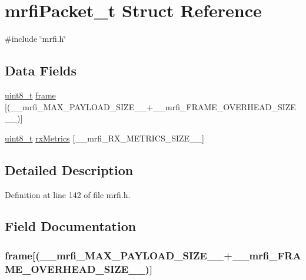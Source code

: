 \hypertarget{structmrfiPacket__t}{\section{mrfi\-Packet\-\_\-t \-Struct \-Reference}
\label{structmrfiPacket__t}
}


{\ttfamily \#include \char`\"{}mrfi.\-h\char`\"{}}

\subsection*{\-Data \-Fields}
\begin{DoxyCompactItemize}
\item 
\hyperlink{bsp__msp430__defs_8h_aba7bc1797add20fe3efdf37ced1182c5}{uint8\-\_\-t} \hyperlink{structmrfiPacket__t_ac596bb226cf04fa6addc35c3c6ac8664}{frame} \mbox{[}(\-\_\-\-\_\-mrfi\-\_\-\-M\-A\-X\-\_\-\-P\-A\-Y\-L\-O\-A\-D\-\_\-\-S\-I\-Z\-E\-\_\-\-\_\-+\-\_\-\-\_\-mrfi\-\_\-\-F\-R\-A\-M\-E\-\_\-\-O\-V\-E\-R\-H\-E\-A\-D\-\_\-\-S\-I\-Z\-E\-\_\-\-\_\-)\mbox{]}
\item 
\hyperlink{bsp__msp430__defs_8h_aba7bc1797add20fe3efdf37ced1182c5}{uint8\-\_\-t} \hyperlink{structmrfiPacket__t_a8b95fbda90600ec59752a405fd198770}{rx\-Metrics} \mbox{[}\-\_\-\-\_\-mrfi\-\_\-\-R\-X\-\_\-\-M\-E\-T\-R\-I\-C\-S\-\_\-\-S\-I\-Z\-E\-\_\-\-\_\-\mbox{]}
\end{DoxyCompactItemize}


\subsection{\-Detailed \-Description}


\-Definition at line 142 of file mrfi.\-h.



\subsection{\-Field \-Documentation}
\hypertarget{structmrfiPacket__t_ac596bb226cf04fa6addc35c3c6ac8664}{
\subsubsection[{frame}]{ {\bf frame}\mbox{[}(\-\_\-\-\_\-mrfi\-\_\-\-M\-A\-X\-\_\-\-P\-A\-Y\-L\-O\-A\-D\-\_\-\-S\-I\-Z\-E\-\_\-\-\_\-+\-\_\-\-\_\-mrfi\-\_\-\-F\-R\-A\-M\-E\-\_\-\-O\-V\-E\-R\-H\-E\-A\-D\-\_\-\-S\-I\-Z\-E\-\_\-\-\_\-)\mbox{]}}}\label{structmrfiPacket__t_ac596bb226cf04fa6addc35c3c6ac8664}


